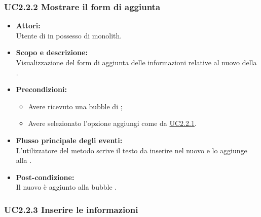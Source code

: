 \subsubsection{UC2.2.2 Mostrare il form di aggiunta} \label{UC2.2.2}

\begin{itemize}
	\item \textbf{Attori:}
	\\Utente di  in possesso di monolith.
	\item \textbf{Scopo e descrizione:} 
	\\Visualizzazione del form di aggiunta delle informazioni relative al nuovo  della .
	\item \textbf{Precondizioni:}
	\begin{itemize}
		\item Avere ricevuto una bubble di ;
		\item Avere selezionato l'opzione aggiungi  come da \hyperref[UC2.2.1]{UC2.2.1}.
	\end{itemize}
	\item \textbf{Flusso principale degli eventi:}
	\\L’utilizzatore del metodo scrive il testo da inserire nel nuovo  e lo aggiunge alla .
	\item \textbf{Post-condizione:}
	\\Il nuovo  è aggiunto alla bubble .
\end{itemize}

\subsubsection{UC2.2.3  Inserire le informazioni} \label{UC2.2.3}

